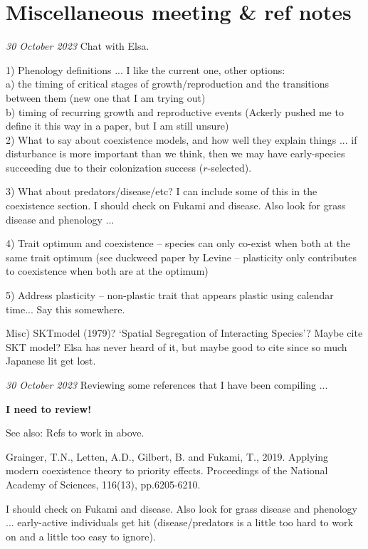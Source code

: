 \documentclass[11pt]{article}
\begin{document}
\clearpage
\section{Miscellaneous meeting \& ref notes}

\emph{30 October 2023} Chat with Elsa.

1) Phenology definitions ... I like the current one, other options:\\
a) the timing of critical stages of growth/reproduction and the transitions between them (new one that I am trying out)\\
b) timing of recurring growth and reproductive events (Ackerly pushed me to define it this way in a paper, but I am still unsure)\\

2) What to say about coexistence models, and how well they explain things ... if disturbance is more important than we think, then we may have early-species succeeding due to their colonization success ($r$-selected). 

3) What about predators/disease/etc? I can include some of this in the coexistence section. I should check on Fukami and disease. Also look for grass disease and phenology ... 

4) Trait optimum and coexistence -- species can only co-exist when both at the same trait optimum (see duckweed paper by Levine -- plasticity only contributes to coexistence when both are at the optimum)

5) Address plasticity -- non-plastic trait that appears plastic using calendar time... Say this somewhere. 

Misc) SKTmodel (1979)? `Spatial Segregation of Interacting Species'?
Maybe cite SKT model? Elsa has never heard of it, but maybe good to cite since so much Japanese lit get lost.

\emph{30 October 2023} Reviewing some references that I have been compiling ... 

{\bf I need to review!}

See also: Refs to work in above. 

Grainger, T.N., Letten, A.D., Gilbert, B. and Fukami, T., 2019. Applying modern coexistence theory to priority effects. Proceedings of the National Academy of Sciences, 116(13), pp.6205-6210. 

I should check on Fukami and disease. Also look for grass disease and phenology ... early-active individuals get hit (disease/predators is a little too hard to work on and a little too easy to ignore). 
\end{document}
